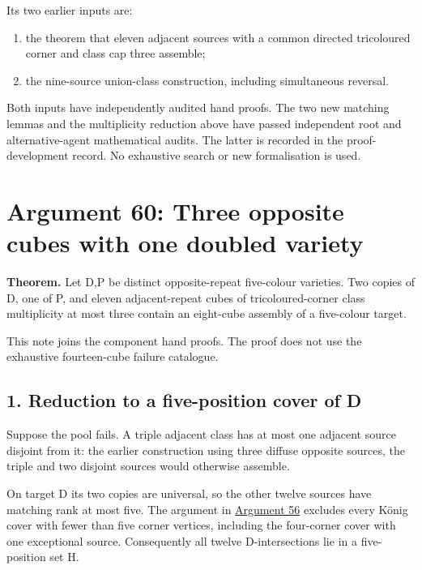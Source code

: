 \documentclass[
  10pt,
]{article}
\providecommand{\tightlist}{%
  \setlength{\itemsep}{0pt}\setlength{\parskip}{0pt}}
\begin{document}
Its two earlier inputs are:

\begin{enumerate}
\def\labelenumi{\arabic{enumi}.}
\tightlist
\item
  the theorem that eleven adjacent sources with a common directed
  tricoloured corner and class cap three assemble;
\item
  the nine-source union-class construction, including simultaneous
  reversal.
\end{enumerate}

Both inputs have independently audited hand proofs. The two new matching
lemmas and the multiplicity reduction above have passed independent root
and alternative-agent mathematical audits. The latter is recorded in the
proof-development record. No exhaustive search or new formalisation is
used.

\hypertarget{arg-60}{%
\section{Argument 60: Three opposite cubes with one doubled
variety}\label{arg-60}}

\textbf{Theorem.} Let D,P be distinct opposite-repeat five-colour
varieties. Two copies of D, one of P, and eleven adjacent-repeat cubes
of tricoloured-corner class multiplicity at most three contain an
eight-cube assembly of a five-colour target.

This note joins the component hand proofs. The proof does not use the
exhaustive fourteen-cube failure catalogue.

\hypertarget{reduction-to-a-five-position-cover-of-d}{%
\subsection*{1. Reduction to a five-position cover of
D}\label{reduction-to-a-five-position-cover-of-d}}

Suppose the pool fails. A triple adjacent class has at most one adjacent
source disjoint from it: the earlier construction using three diffuse
opposite sources, the triple and two disjoint sources would otherwise
assemble.

On target D its two copies are universal, so the other twelve sources
have matching rank at most five. The argument in
\protect\hyperlink{arg-56}{Argument 56} excludes every König cover with
fewer than five corner vertices, including the four-corner cover with
one exceptional source. Consequently all twelve D-intersections lie in a
five-position set H.
\end{document}
